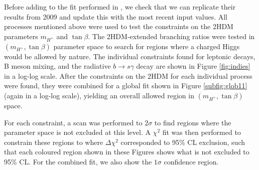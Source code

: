 \documentclass[a4paper,12pt]{article}
\begin{document}
Before adding to the fit performed in \cite{desc}, we check that we can replicate their results from 2009 and update this with the most recent input values. 
All processes mentioned above were used to test the constraints on the 2HDM parameters $m_{H^+}$ and $\tan\beta$. 
The 2HDM-extended branching ratios were tested in $(m_{H^+},\tan\beta)$ parameter space to search for regions where a charged Higgs would be allowed by nature. 
The individual constraints found for leptonic decays, B meson mixing, and the radiative $b\to s\gamma$ decay are shown in Figure \ref{fig:indies} in a log-log scale.
After the constraints on the 2HDM for each individual process were found, they were combined for a global fit shown in Figure \ref{subfig:glob11} (again in a log-log scale), yielding an overall allowed region in $(m_{H^+},\tan\beta)$ space. 

For each constraint, a scan was performed to $2\sigma$ to find regions where the parameter space is not excluded at this level. 
A $\chi^2$ fit was then performed to constrain these regions to where $\Delta\chi^2$ corresponded to 95\% CL exclusion, such that each coloured region shown in these Figures shows what is not excluded to 95\% CL.
For the combined fit, we also show the $1\sigma$ confidence region. 
\end{document}
